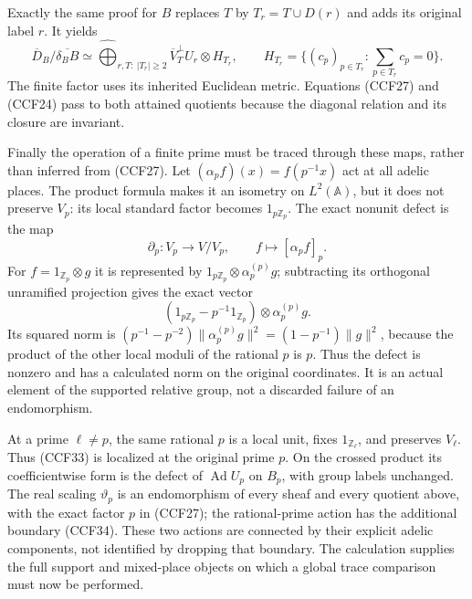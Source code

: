 Exactly the same proof for $B$ replaces $T$ by $T_r=T\cup D(r)$
and adds its original label $r$. It yields
\[
 \overline D_B/\overline{\delta_BB}
   \simeq\widehat{\bigoplus}_{r,T:\ |T_r|\ge2}
       \overline V_T^{\perp}U_r\otimes H_{T_r},\qquad
 H_{T_r}=\{(c_p)_{p\in T_r}:\sum_{p\in T_r}c_p=0\}.
 \tag{CCF32}
\]
The finite factor uses its inherited Euclidean metric. Equations
(CCF27) and (CCF24) pass to both attained quotients because
the diagonal relation and its closure are invariant.

Finally the operation of a finite prime must be traced through
these maps, rather than inferred from (CCF27). Let
$(\alpha_pf)(x)=f(p^{-1}x)$ act at all adelic places. The
product formula makes it an isometry on $L^2(\mathbb A)$,
but it does not preserve $V_p$: its local standard factor
becomes $1_{p\mathbb Z_p}$. The exact nonunit defect is the map
\[
 \partial_p:V_p\longrightarrow V/V_p,\qquad
      f\longmapsto[\alpha_pf]_p.
 \tag{CCF33}
\]
For $f=1_{\mathbb Z_p}\otimes g$ it is represented by
$1_{p\mathbb Z_p}\otimes\alpha_p^{(p)}g$; subtracting its
orthogonal unramified projection gives the exact vector
\[
 (1_{p\mathbb Z_p}-p^{-1}1_{\mathbb Z_p})
                  \otimes\alpha_p^{(p)}g.
 \tag{CCF34}
\]
Its squared norm is
$(p^{-1}-p^{-2})\|\alpha_p^{(p)}g\|^2
=(1-p^{-1})\|g\|^2$, because the product of the other local
moduli of the rational $p$ is $p$. Thus the defect is nonzero
and has a calculated norm on the original coordinates.
It is an actual element of the supported relative group,
not a discarded failure of an endomorphism.

At a prime $\ell\ne p$, the same rational $p$ is a local
unit, fixes $1_{\mathbb Z_\ell}$, and preserves $V_\ell$.
Thus (CCF33) is localized at the original prime $p$. On the
crossed product its coefficientwise form is the defect of
$\operatorname{Ad}U_p$ on $B_p$, with group labels unchanged.
The real scaling $\vartheta_p$ is an endomorphism of every
sheaf and every quotient above, with the exact factor $p$
in (CCF27); the rational-prime action has the additional
boundary (CCF34). These two actions are connected by their
explicit adelic components, not identified by dropping that
boundary. The calculation supplies the full support and
mixed-place objects on which a global trace comparison must
now be performed.

